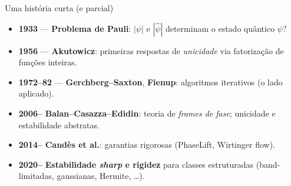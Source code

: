 \documentclass[10pt,aspectratio=169]{beamer}
\newcommand{\abs}[1]{\left|#1\right|}
\newcommand{\hl}[1]{{\color{accent}\textbf{#1}}}
\newcommand{\fade}[1]{{\color{fgmute}#1}}
\begin{document}
\begin{frame}{Uma história curta (e parcial)}
  \begin{itemize}\small
    \setlength{\itemsep}{0.42em}
    \item \hl{1933} --- \textbf{Problema de Pauli}: $\abs{\psi}$ e
          $\abs{\hat\psi}$ determinam o estado quântico $\psi$?
    \pause
    \item \hl{1956} --- \textbf{Akutowicz}: primeiras respostas de
          \emph{unicidade} via fatorização de funções inteiras.
    \pause
    \item \hl{1972--82} --- \textbf{Gerchberg--Saxton}, \textbf{Fienup}:
          algoritmos iterativos \fade{(o lado aplicado)}.
    \pause
    \item \hl{2006--} \textbf{Balan--Casazza--Edidin}: teoria de
          \emph{frames de fase}; unicidade e estabilidade abstratas.
    \pause
    \item \hl{2014--} \textbf{Candès et al.}: garantias rigorosas
          (PhaseLift, Wirtinger flow).
    \pause
    \item \hl{2020--} \textbf{Estabilidade \emph{sharp} e rigidez}
          para classes estruturadas (band-limitadas, gaussianas,
          Hermite, \ldots).
  \end{itemize}
\end{frame}
\end{document}
